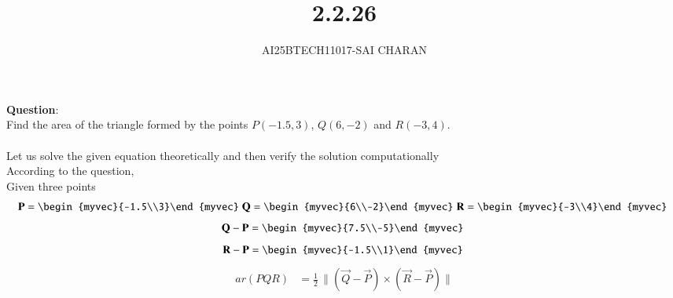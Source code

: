 \documentclass[journal]{IEEEtran}
\begin{document}

\vspace{3cm}

\title{2.2.26}
\author{AI25BTECH11017-SAI CHARAN}
 \maketitle
{\let\newpage\relax\maketitle}
\renewcommand{\thefigure}{\theenumi}
\renewcommand{\thetable}{\theenumi}
\setlength{\intextsep}{10pt} %
\renewcommand{\thetable}{\theenumi}
\textbf{Question}:\\
Find the area of the triangle formed by the points $P(-1.5,3)$, $Q(6,-2)$ and $R(-3,4)$.\\
\solution \\
Let us solve the given equation theoretically and then verify the solution computationally \\
According to the question, \\
Given three points\\
\begin{align}
  \vec{P}=\begin{myvec}{-1.5\\3}\end{myvec}\;
  \vec{Q}=\begin{myvec}{6\\-2}\end{myvec}\;
  \vec{R}=\begin{myvec}{-3\\4}\end{myvec}\
   \end{align}
   \begin{align}
 \vec{Q}-\vec{P}=\begin{myvec}{7.5\\-5}\end{myvec}\
\end{align}
\begin{align}
  \vec{R}-\vec{P}=\begin{myvec}{-1.5\\1}\end{myvec}\
\end{align}
\begin{align}
ar(PQR) &= \frac{1}{2} \, \|(\vec{Q} - \vec{P}) \times (\vec{R} - \vec{P}) \|
\end{align}
\end{document}
